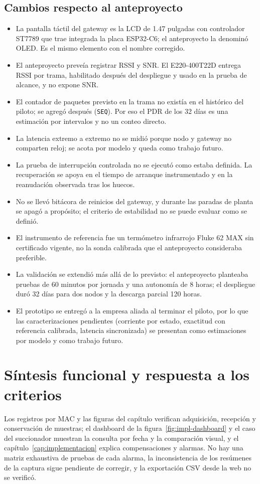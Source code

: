 \subsection{Cambios respecto al anteproyecto}
\begin{itemize}
  \item La pantalla táctil del gateway es la LCD de 1.47 pulgadas con controlador ST7789 que trae integrada la placa ESP32-C6; el anteproyecto la denominó OLED. Es el mismo elemento con el nombre corregido.
  \item El anteproyecto preveía registrar RSSI y SNR. El E220-400T22D entrega RSSI por trama, habilitado después del despliegue y usado en la prueba de alcance, y no expone SNR.
  \item El contador de paquetes previsto en la trama no existía en el histórico del piloto; se agregó después (\texttt{SEQ}). Por eso el PDR de los 32 días es una estimación por intervalos y no un conteo directo.
  \item La latencia extremo a extremo no se midió porque nodo y gateway no comparten reloj; se acota por modelo y queda como trabajo futuro.
  \item La prueba de interrupción controlada no se ejecutó como estaba definida. La recuperación se apoya en el tiempo de arranque instrumentado y en la reanudación observada tras los huecos.
  \item No se llevó bitácora de reinicios del gateway, y durante las paradas de planta se apagó a propósito; el criterio de estabilidad no se puede evaluar como se definió.
  \item El instrumento de referencia fue un termómetro infrarrojo Fluke 62 MAX sin certificado vigente, no la sonda calibrada que el anteproyecto consideraba preferible.
  \item La validación se extendió más allá de lo previsto: el anteproyecto planteaba pruebas de 60 minutos por jornada y una autonomía de 8 horas; el despliegue duró 32 días para dos nodos y la descarga parcial 120 horas.
  \item El prototipo se entregó a la empresa aliada al terminar el piloto, por lo que las caracterizaciones pendientes (corriente por estado, exactitud con referencia calibrada, latencia sincronizada) se presentan como estimaciones por modelo y como trabajo futuro.
\end{itemize}

\section{Síntesis funcional y respuesta a los criterios}
\label{sec:resultados-sintesis}
Los registros por MAC y las figuras del capítulo verifican adquisición, recepción y conservación de muestras; el dashboard de la figura~\ref{fig:impl-dashboard} y el caso del succionador muestran la consulta por fecha y la comparación visual, y el capítulo~\ref{cap:implementacion} explica compensaciones y alarmas. No hay una matriz exhaustiva de pruebas de cada alarma, la inconsistencia de los resúmenes de la captura sigue pendiente de corregir, y la exportación CSV desde la web no se verificó.

